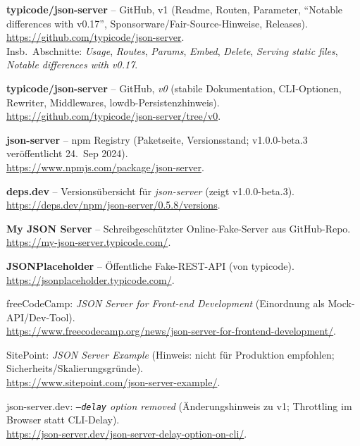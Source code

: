 \documentclass[11pt,a4paper]{article}
\begin{document}
\begin{thebibliography}{99}

\textbf{typicode/json-server} -- GitHub, v1 (Readme, Routen, Parameter, \enquote{Notable differences with v0.17}, Sponsorware/Fair-Source-Hinweise, Releases).\\
\url{https://github.com/typicode/json-server}.\\
Insb.\ Abschnitte: \emph{Usage}, \emph{Routes}, \emph{Params}, \emph{Embed}, \emph{Delete}, \emph{Serving static files}, \emph{Notable differences with v0.17}.

\textbf{typicode/json-server} -- GitHub, \emph{v0} (stabile Dokumentation, CLI-Optionen, Rewriter, Middlewares, lowdb-Persistenzhinweis).\\
\url{https://github.com/typicode/json-server/tree/v0}.

\textbf{json-server} -- npm Registry (Paketseite, Versionsstand; v1.0.0-beta.3 veröffentlicht 24.\ Sep 2024).\\
\url{https://www.npmjs.com/package/json-server}.

\textbf{deps.dev} -- Versionsübersicht für \emph{json-server} (zeigt v1.0.0-beta.3).\\
\url{https://deps.dev/npm/json-server/0.5.8/versions}.

\textbf{My JSON Server} -- Schreibgeschützter Online-Fake-Server aus GitHub-Repo.\\
\url{https://my-json-server.typicode.com/}.

\textbf{JSONPlaceholder} -- Öffentliche Fake-REST-API (von typicode).\\
\url{https://jsonplaceholder.typicode.com/}.

freeCodeCamp: \emph{JSON Server for Front-end Development} (Einordnung als Mock-API/Dev-Tool).\\
\url{https://www.freecodecamp.org/news/json-server-for-frontend-development/}.

SitePoint: \emph{JSON Server Example} (Hinweis: nicht für Produktion empfohlen; Sicherheits/Skalierungsgründe).\\
\url{https://www.sitepoint.com/json-server-example/}.

json-server.dev: \emph{\texttt{--delay} option removed} (Änderungshinweis zu v1; Throttling im Browser statt CLI-Delay).\\
\url{https://json-server.dev/json-server-delay-option-on-cli/}.

\end{thebibliography}
\end{document}
